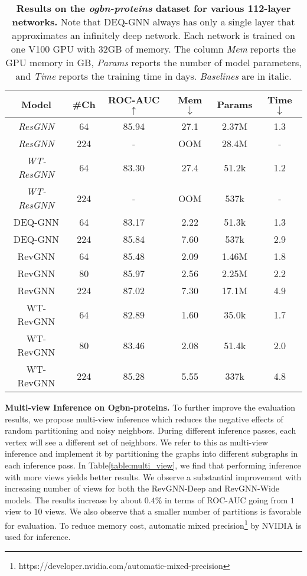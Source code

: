 \documentclass{article}
\newcommand{\tblLabel}{Table\xspace}
\newcommand{\mysection}[1]{\vspace{0pt}\noindent\textbf{#1.}}
\begin{document}
\begin{table}[t]
\centering
\setlength{\tabcolsep}{2pt}
\caption{\textbf{Results on the \emph{ogbn-proteins} dataset for various 112-layer networks.} Note that DEQ-GNN always has only a single layer that approximates an infinitely deep network. Each network is trained on one V100 GPU with 32GB of memory. The column \emph{Mem} reports the GPU memory in GB, \emph{Params} reports the number of model parameters, and \emph{Time} reports the training time in days. \textit{Baselines} are in italic.}
\vspace{2pt}
\begin{tabular}{cccccc}
\toprule
  \label{table:ogbn_proteins_ablation}
  \centering
Model & \#Ch & ROC-AUC $\uparrow$  & Mem $\downarrow$ & Params & Time $\downarrow$ \\
\midrule
\textit{ResGNN} & 64 & 85.94 & 27.1 
& 2.37M & 1.3 \\
\textit{ResGNN} & 224 & - & OOM 
& 28.4M & - \\
\midrule
\textit{WT-ResGNN} & 64 & 83.30 & 27.4
& 51.2k & 1.2 \\
\textit{WT-ResGNN} & 224 & - & OOM  
& 537k & - \\
\midrule
DEQ-GNN & 64 & 83.17 & 2.22 
& 51.3k & 1.3 \\
DEQ-GNN & 224 & 85.84 & 7.60 
& 537k & 2.9 \\
\midrule
RevGNN & 64 & 85.48 & 2.09
& 1.46M & 1.8 \\
RevGNN & 80 & 85.97 & 2.56 
& 2.25M & 2.2 \\
RevGNN & 224 & 87.02 & 7.30
& 17.1M & 4.9 \\
\midrule
WT-RevGNN & 64 & 82.89 & 1.60 
& 35.0k & 1.7 \\
WT-RevGNN & 80 & 83.46 & 2.08 
& 51.4k & 2.0 \\
WT-RevGNN & 224 & 85.28 & 5.55 
& 337k & 4.8 \\
\bottomrule
\end{tabular}
\end{table}

\mysection{Multi-view Inference on Ogbn-proteins}
To further improve the evaluation results, we propose multi-view inference which reduces the negative effects of random partitioning and noisy neighbors. During different inference passes, each vertex will see a different set of neighbors. We refer to this as multi-view inference and implement it by partitioning the graphs into different subgraphs in each inference pass. 
In \tblLabel \ref{table:multi_view}, we find that performing inference with more views yields better results. We observe a substantial improvement with increasing number of views for both the RevGNN-Deep and RevGNN-Wide models. The results increase by about $0.4\%$ in terms of ROC-AUC going from $1$ view to $10$ views. We also observe that a smaller number of partitions is favorable for evaluation. To reduce memory cost, automatic mixed precision\footnote{https://developer.nvidia.com/automatic-mixed-precision} by NVIDIA is used for inference.
\end{document}
